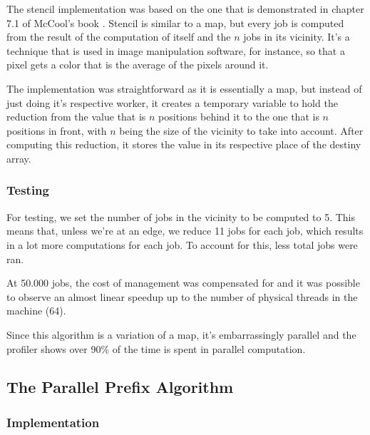 \documentclass[10pt,journal]{IEEEtran}
\begin{document}
The stencil implementation was based on the one that is demonstrated in chapter 7.1 of McCool's book \cite{mccool}. Stencil is similar to a map, but every job is computed from the result of the computation of itself and the $ n $ jobs in its vicinity. It's a technique that is used in image manipulation software, for instance, so that a pixel gets a color that is the average of the pixels around it.

The implementation was straightforward as it is essentially a map, but instead of just doing it's respective worker, it creates a temporary variable to hold the reduction from the value that is $ n $ positions behind it to the one that is $ n $ positions in front, with $ n $ being the size of the vicinity to take into account. After computing this reduction, it stores the value in its respective place of the destiny array.

\subsubsection{Testing}

For testing, we set the number of jobs in the vicinity to be computed to 5. This means that, unless we're at an edge, we reduce 11 jobs for each job, which results in a lot more computations for each job. To account for this, less total jobs were ran.

At 50.000 jobs, the cost of management was compensated for and it was possible to observe an almost linear speedup up to the number of physical threads in the machine (64).

Since this algorithm is a variation of a map, it's embarrassingly parallel and the profiler shows over 90\% of the time is spent in parallel computation.

\subsection{The Parallel Prefix Algorithm}

\subsubsection{Implementation}
\end{document}
